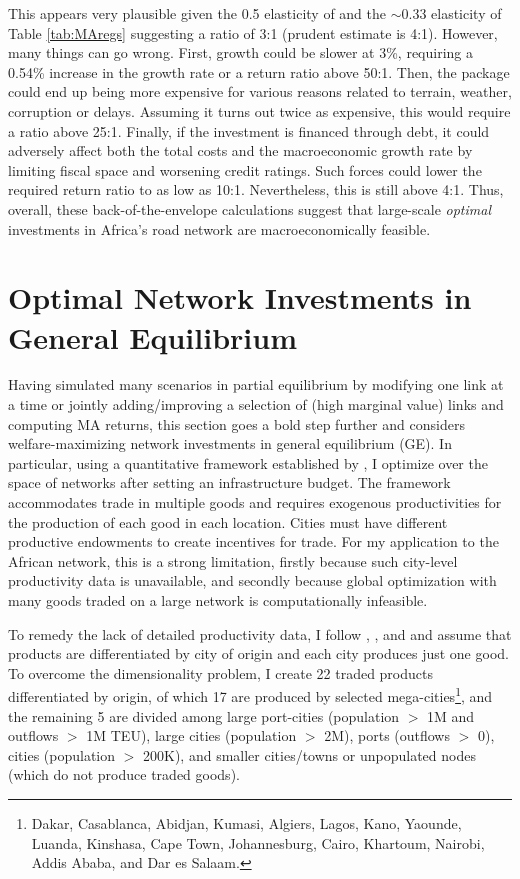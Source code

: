 \documentclass[a4paper]{article}
\begin{document}
 This appears very plausible given the 0.5 elasticity of \citet{donaldson2016railroads} and the $\sim$0.33 elasticity of Table \ref{tab:MAregs} suggesting a ratio of 3:1 (prudent estimate is 4:1). However, many things can go wrong. First, growth could be slower at 3\%, requiring a 0.54\% increase in the growth rate or a return ratio above 50:1. Then, the package could end up being more expensive for various reasons related to terrain, weather, corruption or delays.  Assuming it turns out twice as expensive, this would require a ratio above 25:1. Finally, if the investment is financed through debt, it could adversely affect both the total costs and the macroeconomic growth rate by limiting fiscal space and worsening credit ratings. Such forces could lower the required return ratio to as low as 10:1. Nevertheless, this is still above 4:1. Thus, overall, these back-of-the-envelope calculations suggest that large-scale \emph{optimal} investments in Africa's road network are macroeconomically feasible.



\section{Optimal Network Investments in General Equilibrium} \label{sec:GE}

Having simulated many scenarios in partial equilibrium by modifying one link at a time or jointly adding/improving a selection of (high marginal value) links and computing MA returns, this section goes a bold step further and considers welfare-maximizing network investments in general equilibrium (GE). In particular, using a quantitative framework established by \citet{fajgelbaum2020optimal}, I optimize over the space of networks after setting an infrastructure budget. The framework accommodates trade in multiple goods and requires exogenous productivities for the production of each good in each location. Cities must have different productive endowments to create incentives for trade. For my application to the African network, this is a strong limitation, firstly because such city-level productivity data is unavailable, and secondly because global optimization with many goods traded on a large network is computationally infeasible. \newline 

To remedy the lack of detailed productivity data, I follow \citet{armington1969theory}, \citet{fajgelbaum2020optimal}, and \citet{graff2019spatial} and assume that products are differentiated by city of origin and each city produces just one good. To overcome the dimensionality problem, I create 22 traded products differentiated by origin, of which 17 are produced by selected mega-cities\footnote{Dakar, Casablanca, Abidjan, Kumasi, Algiers, Lagos, Kano, Yaounde, Luanda, Kinshasa, Cape Town, Johannesburg, Cairo, Khartoum, Nairobi, Addis Ababa, and Dar es Salaam.}, and the remaining 5 are divided among large port-cities (population $>$ 1M and outflows $>$ 1M TEU), large cities (population $>$ 2M), ports (outflows $>$ 0), cities (population $>$ 200K), and smaller cities/towns or unpopulated nodes (which do not produce traded goods). \newline
\end{document}

